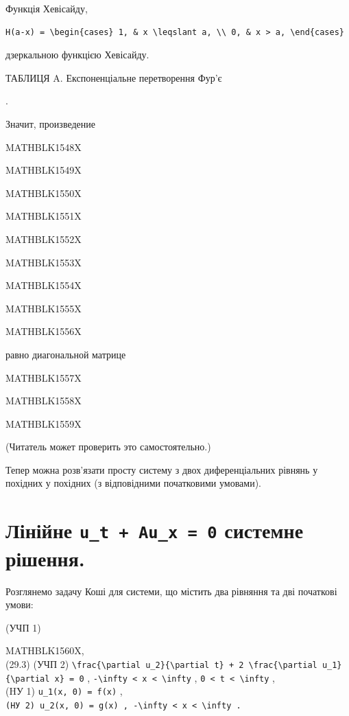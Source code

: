 \documentclass[
  ukrainian,
]{article}
\begin{document}
Функція Хевісайду,

\begin{verbatim}
H(a-x) = \begin{cases} 1, & x \leqslant a, \\ 0, & x > a, \end{cases}
\end{verbatim}

дзеркальною функцією Хевісайду.

ТАБЛИЦЯ A. Експоненціальне перетворення Фур'є

.

Значит, произведение

MATHBLK1548X

MATHBLK1549X

MATHBLK1550X

MATHBLK1551X

MATHBLK1552X

MATHBLK1553X

MATHBLK1554X

MATHBLK1555X

MATHBLK1556X

равно диагональной матрице

MATHBLK1557X

MATHBLK1558X

MATHBLK1559X

(Читатель может проверить это самостоятельно.)

Тепер можна розв'язати просту систему з двох диференціальних рівнянь у
похідних у похідних (з відповідними початковими умовами).

\section{\texorpdfstring{Лінійне \texttt{u\_t\ +\ Au\_x\ =\ 0} системне
рішення.}{Лінійне u\_t + Au\_x = 0 системне рішення.}}\label{ux43bux456ux43dux456ux439ux43dux435-u_t-au_x-0-ux441ux438ux441ux442ux435ux43cux43dux435-ux440ux456ux448ux435ux43dux43dux44f.}

Розглянемо задачу Коші для системи, що містить два рівняння та дві
початкові умови:

(УЧП 1)

MATHBLK1560X,\\
(29.3) (УЧП 2)
\texttt{\textbackslash{}frac\{\textbackslash{}partial\ u\_2\}\{\textbackslash{}partial\ t\}\ +\ 2\ \textbackslash{}frac\{\textbackslash{}partial\ u\_1\}\{\textbackslash{}partial\ x\}\ =\ 0}
,
\texttt{-\textbackslash{}infty\ \textless{}\ x\ \textless{}\ \textbackslash{}infty}
, \texttt{0\ \textless{}\ t\ \textless{}\ \textbackslash{}infty} ,\\
(HУ 1) \texttt{u\_1(x,\ 0)\ =\ f(x)} ,\\
\texttt{(HУ\ 2)\ \textquotesingle{}u\_2(x,\ 0)\ =\ g(x)\textquotesingle{}\ ,\ \textquotesingle{}-\textbackslash{}infty\ \textless{}\ x\ \textless{}\ \textbackslash{}infty\textquotesingle{}\ .}
\end{document}
